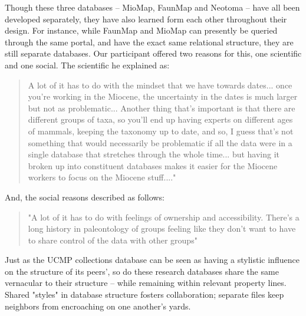 Though these three databases -- MioMap, FaunMap and Neotoma -- have all been developed separately, they have also learned form each other throughout their design. For instance, while FaunMap and MioMap can presently be queried through the same portal, and have the exact same relational structure, they are still separate databases.  Our participant offered two reasons for this, one scientific and one social. The scientific he explained as:
\begin{quote}
A lot of it has to do with the mindset that we have towards dates... once you're working in the Miocene, the uncertainty in the dates is much larger but not as problematic... Another thing that's important is that there are different groups of taxa, so you'll end up having experts on different ages of mammals, keeping the taxonomy up to date, and so, I guess that's not something that would necessarily be problematic if all the data were in a single database that stretches through the whole time... but having it broken up into constituent databases makes it easier for the Miocene workers to focus on the Miocene stuff...."
\end{quote}
And, the social reasons described as follows:
\begin{quote}
"A lot of it has to do with feelings of ownership and accessibility. There's a long history in paleontology of groups feeling like they don't want to have to share control of the data with other groups"
\end{quote}
Just as the UCMP collections database can be seen as having a stylistic influence on the structure of its peers', so do these research databases share the same vernacular to their structure -- while remaining within relevant property lines. Shared "styles" in database structure fosters collaboration; separate files keep neighbors from encroaching on one another's yards.

